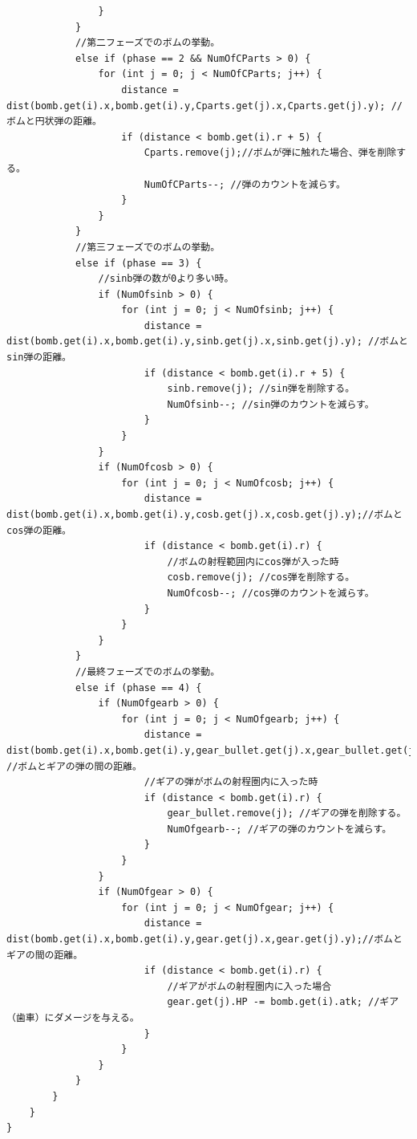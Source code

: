 \documentclass[a4paper,titlepage,11pt]{ltjsarticle}
\begin{document}
\begin{lstlisting}
                }
            }
            //第二フェーズでのボムの挙動。
            else if (phase == 2 && NumOfCParts > 0) {
                for (int j = 0; j < NumOfCParts; j++) {
                    distance = dist(bomb.get(i).x,bomb.get(i).y,Cparts.get(j).x,Cparts.get(j).y); //ボムと円状弾の距離。
                    if (distance < bomb.get(i).r + 5) {
                        Cparts.remove(j);//ボムが弾に触れた場合、弾を削除する。
                        NumOfCParts--; //弾のカウントを減らす。
                    }
                }
            }
            //第三フェーズでのボムの挙動。
            else if (phase == 3) {
                //sinb弾の数が0より多い時。
                if (NumOfsinb > 0) {
                    for (int j = 0; j < NumOfsinb; j++) {
                        distance = dist(bomb.get(i).x,bomb.get(i).y,sinb.get(j).x,sinb.get(j).y); //ボムとsin弾の距離。
                        if (distance < bomb.get(i).r + 5) {
                            sinb.remove(j); //sin弾を削除する。
                            NumOfsinb--; //sin弾のカウントを減らす。
                        }
                    }
                }
                if (NumOfcosb > 0) {
                    for (int j = 0; j < NumOfcosb; j++) {
                        distance = dist(bomb.get(i).x,bomb.get(i).y,cosb.get(j).x,cosb.get(j).y);//ボムとcos弾の距離。
                        if (distance < bomb.get(i).r) {
                            //ボムの射程範囲内にcos弾が入った時
                            cosb.remove(j); //cos弾を削除する。
                            NumOfcosb--; //cos弾のカウントを減らす。
                        }
                    }
                }
            }
            //最終フェーズでのボムの挙動。
            else if (phase == 4) {
                if (NumOfgearb > 0) {
                    for (int j = 0; j < NumOfgearb; j++) {
                        distance = dist(bomb.get(i).x,bomb.get(i).y,gear_bullet.get(j).x,gear_bullet.get(j).y); //ボムとギアの弾の間の距離。
                        //ギアの弾がボムの射程圏内に入った時
                        if (distance < bomb.get(i).r) {
                            gear_bullet.remove(j); //ギアの弾を削除する。
                            NumOfgearb--; //ギアの弾のカウントを減らす。
                        }
                    }
                }
                if (NumOfgear > 0) {
                    for (int j = 0; j < NumOfgear; j++) {
                        distance = dist(bomb.get(i).x,bomb.get(i).y,gear.get(j).x,gear.get(j).y);//ボムとギアの間の距離。
                        if (distance < bomb.get(i).r) {
                            //ギアがボムの射程圏内に入った場合
                            gear.get(j).HP -= bomb.get(i).atk; //ギア（歯車）にダメージを与える。
                        }
                    }
                }
            }
        }
    }
}
\end{lstlisting}
\end{document}
